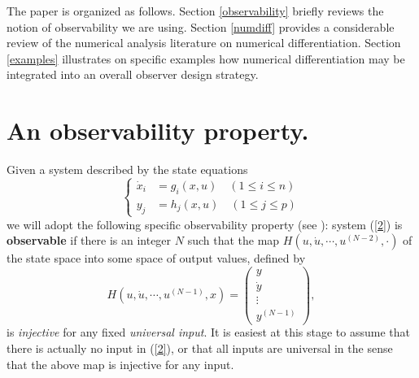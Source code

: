 
The paper is organized as follows.  Section \ref{observability} briefly reviews
the notion of observability we are using.  Section \ref{numdiff} provides a 
considerable review of the numerical analysis literature on numerical
differentiation.  Section \ref{examples} illustrates on specific examples 
how numerical
differentiation
may be integrated into an overall observer design strategy.  


\section{An observability property.}\setcounter{equation}{0}
\label{observability}

Given a system described by the state equations
\begin{equation}
\left\{
\begin{array}{rcl}
\dot x_i & = g_i(x, u) \quad (1 \le i \le n)\\
y_j & = h_j(x, u) \quad (1 \le j \le p)\end{array}
\right.
\label{2}
\end{equation}
we will adopt the following specific observability property (see
\cite{chung1990,grizzle1990b,grizzle1990c,grizzle1990a,moraal1992,song1992,moraal1993b,moraal1993a}):
system (\ref{2}) is {\bf observable} if there is an integer $N$ such
that the map $H\left(u, \dot u, \cdots, u^{(N-2)}, \cdot \right)$ of
the state space into some space of output values, defined by
\begin{equation}
H\left(u, \dot u, \cdots, u^{(N-1)}, x \right) = 
\left( 
\begin{array}{c} y \\ \dot
y \\ \vdots \\ y^{(N-1)} \end{array}\right), \label{3}
\end{equation}
is {\it injective} for any fixed {\it universal input}.
It is easiest at this stage to assume that there is actually
no input in (\ref{2}), or that all inputs are universal in the sense that
the above map is injective for any input. 

